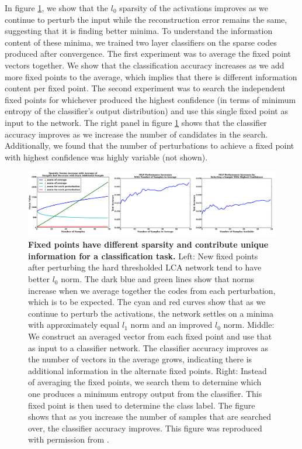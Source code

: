 In figure \ref{fig:ch2_lca_norms_and_acc}, we show that the $l_{0}$ sparsity of the activations improves as we continue to perturb the input while the reconstruction error remains the same, suggesting that it is finding better minima. To understand the information content of these minima, we trained two layer classifiers on the sparse codes produced after convergence. The first experiment was to average the fixed point vectors together. We show that the classification accuracy increases as we add more fixed points to the average, which implies that there is different information content per fixed point. The second experiment was to search the independent fixed points for whichever produced the highest confidence (in terms of minimum entropy of the classifier's output distribution) and use this single fixed point as input to the network. The right panel in figure \ref{fig:ch2_lca_norms_and_acc} shows that the classifier accuracy improves as we increase the number of candidates in the search. Additionally, we found that the number of perturbations to achieve a fixed point with highest confidence was highly variable (not shown).

\begin{figure}[h]
    \centering
    \includegraphics[width=\textwidth]{figures/lca_norms_acc.png}
    \caption{\textbf{Fixed points have different sparsity and contribute unique information for a classification task.} Left: New fixed points after perturbing the hard thresholded LCA network tend to have better $l_{0}$ norm. The dark blue and green lines show that norms increase when we average together the codes from each perturbation, which is to be expected. The cyan and red curves show that as we continue to perturb the activations, the network settles on a minima with approximately equal $l_{1}$ norm and an improved $l_{0}$ norm. Middle: We construct an averaged vector from each fixed point and use that as input to a classifier network. The classifier accuracy improves as the number of vectors in the average grows, indicating there is additional information in the alternate fixed points. Right: Instead of averaging the fixed points, we search them to determine which one produces a minimum entropy output from the classifier. This fixed point is then used to determine the class label. The figure shows that as you increase the number of samples that are searched over, the classifier accuracy improves. This figure was reproduced with permission from \parencite{shainin2016sampling}.}
    \label{fig:ch2_lca_norms_and_acc}
\end{figure}


